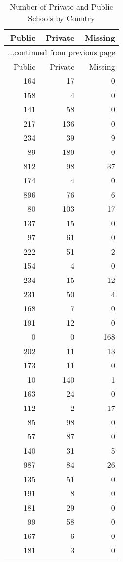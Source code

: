 \documentclass[letterpaper,11pt]{article}
\begin{document}
\begin{longtable}{rrr}
\caption{Number of Private and Public Schools by Country} \\ 
  \hline
  Public & Private & Missing \\ \endfirsthead \multicolumn{3}{l}{{...continued from previous page}}\\ \hline Public & Private & Missing  \\ \hline \endhead \hline
164 &  17 &   0 \\ 
  158 &   4 &   0 \\ 
  141 &  58 &   0 \\ 
  217 & 136 &   0 \\ 
  234 &  39 &   9 \\ 
   89 & 189 &   0 \\ 
  812 &  98 &  37 \\ 
  174 &   4 &   0 \\ 
  896 &  76 &   6 \\ 
   80 & 103 &  17 \\ 
  137 &  15 &   0 \\ 
   97 &  61 &   0 \\ 
  222 &  51 &   2 \\ 
  154 &   4 &   0 \\ 
  234 &  15 &  12 \\ 
  231 &  50 &   4 \\ 
  168 &   7 &   0 \\ 
  191 &  12 &   0 \\ 
    0 &   0 & 168 \\ 
  202 &  11 &  13 \\ 
  173 &  11 &   0 \\ 
   10 & 140 &   1 \\ 
  163 &  24 &   0 \\ 
  112 &   2 &  17 \\ 
   85 &  98 &   0 \\ 
   57 &  87 &   0 \\ 
  140 &  31 &   5 \\ 
  987 &  84 &  26 \\ 
  135 &  51 &   0 \\ 
  191 &   8 &   0 \\ 
  181 &  29 &   0 \\ 
   99 &  58 &   0 \\ 
  167 &   6 &   0 \\ 
  181 &   3 &   0 \\ 

\end{longtable}
\end{document}
